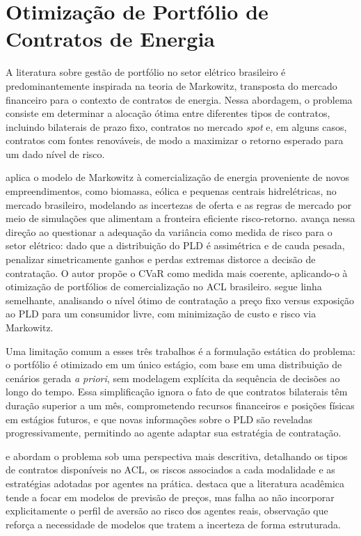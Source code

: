 \section{Otimização de Portfólio de Contratos de Energia}
\label{sec:rl_portfolio}

A literatura sobre gestão de portfólio no setor elétrico brasileiro é predominantemente inspirada na teoria de Markowitz, transposta do mercado financeiro para o contexto de contratos de energia. Nessa abordagem, o problema consiste em determinar a alocação ótima entre diferentes tipos de contratos, incluindo bilaterais de prazo fixo, contratos no mercado \emph{spot} e, em alguns casos, contratos com fontes renováveis, de modo a maximizar o retorno esperado para um dado nível de risco.

 aplica o modelo de Markowitz à comercialização de energia proveniente de novos empreendimentos, como biomassa, eólica e pequenas centrais hidrelétricas, no mercado brasileiro, modelando as incertezas de oferta e as regras de mercado por meio de simulações que alimentam a fronteira eficiente risco-retorno.  avança nessa direção ao questionar a adequação da variância como medida de risco para o setor elétrico: dado que a distribuição do PLD é assimétrica e de cauda pesada, penalizar simetricamente ganhos e perdas extremas distorce a decisão de contratação. O autor propõe o CVaR como medida mais coerente, aplicando-o à otimização de portfólios de comercialização no ACL brasileiro. \cite{munhoz2018} segue linha semelhante, analisando o nível ótimo de contratação a preço fixo versus exposição ao PLD para um consumidor livre, com minimização de custo e risco via Markowitz.

Uma limitação comum a esses três trabalhos é a formulação estática do problema: o portfólio é otimizado em um único estágio, com base em uma distribuição de cenários gerada \emph{a priori}, sem modelagem explícita da sequência de decisões ao longo do tempo. Essa simplificação ignora o fato de que contratos bilaterais têm duração superior a um mês, comprometendo recursos financeiros e posições físicas em estágios futuros, e que novas informações sobre o PLD são reveladas progressivamente, permitindo ao agente adaptar sua estratégia de contratação.

 e \cite{carvalho2021} abordam o problema sob uma perspectiva mais descritiva, detalhando os tipos de contratos disponíveis no ACL, os riscos associados a cada modalidade e as estratégias adotadas por agentes na prática. \cite{carvalho2021} destaca que a literatura acadêmica tende a focar em modelos de previsão de preços, mas falha ao não incorporar explicitamente o perfil de aversão ao risco dos agentes reais, observação que reforça a necessidade de modelos que tratem a incerteza de forma estruturada.

